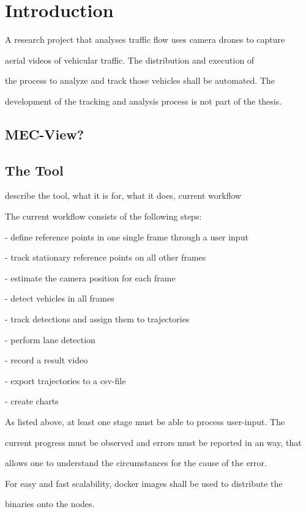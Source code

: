 \chapter{Introduction}


A research project that analyses traffic flow uses camera drones to capture

aerial videos of vehicular traffic. The distribution and execution of

the process to analyze and track those vehicles shall be automated. The

development of the tracking and analysis process is not part of the thesis.

\section{MEC-View?}

\section{The Tool}

describe the tool, what it is for, what it does, current workflow

The current workflow consists of the following steps:

- define reference points in one single frame through a user input

- track stationary reference points on all other frames

- estimate the camera position for each frame

- detect vehicles in all frames

- track detections and assign them to trajectories

- perform lane detection

- record a result video

- export trajectories to a csv-file

- create charts



As listed above, at least one stage must be able to process user-input. The

current progress must be observed and errors must be reported in an way, that

allows one to understand the circumstances for the cause of the error.

For easy and fast scalability, docker images shall be used to distribute the

binaries onto the nodes.



